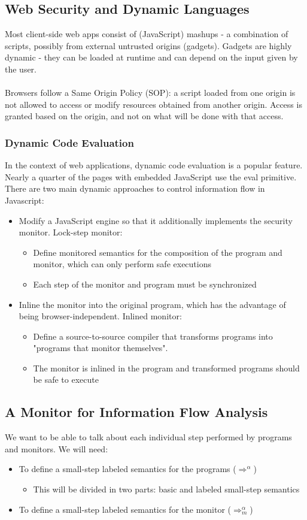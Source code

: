 \documentclass[10pt,a4paper]{report}
\begin{document}
\subsection{Web Security and Dynamic Languages}
Most client-side web apps consist of (JavaScript) mashups - a combination of scripts, possibly from external untrusted origins (gadgets). Gadgets are highly dynamic - they can be loaded at runtime and can depend on the input given by the user.\\
\\
Browsers follow a Same Origin Policy (SOP): a script loaded from one origin is not allowed to access or modify resources obtained from another origin. Access is granted based on the origin, and not on what will be done with that access.
\subsubsection{Dynamic Code Evaluation}
In the context of web applications, dynamic code evaluation is a popular feature. Nearly a quarter of the pages with embedded JavaScript use the eval primitive. There are two main dynamic approaches to control information flow in Javascript:
\begin{itemize}
\item Modify a JavaScript engine so that it additionally implements the security monitor. Lock-step monitor:
\begin{itemize}
\item Define monitored semantics for the composition of the program and monitor, which can only perform safe executions
\item Each step of the monitor and program must be synchronized
\end{itemize}
\item Inline the monitor into the original program, which has the advantage of being browser-independent. Inlined monitor:
\begin{itemize}
\item Define a source-to-source compiler that transforms programs into "programs that monitor themselves".
\item The monitor is inlined in the program and transformed programs should be safe to execute
\end{itemize}
\end{itemize}
\subsection{A Monitor for Information Flow Analysis}
We want to be able to talk about each individual step performed by programs and monitors. We will need:
\begin{itemize}
\item To define a small-step labeled semantics for the programs ($\Rightarrow^\alpha$)
\begin{itemize}
\item This will be divided in two parts: basic and labeled small-step semantics
\end{itemize}
\item To define a small-step labeled semantics for the monitor ($\Rightarrow_m^\alpha$)
\end{itemize}
\end{document}
